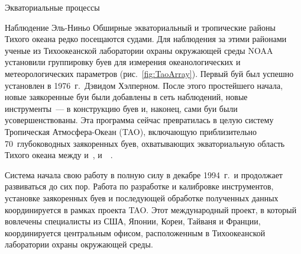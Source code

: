 \begin{chapter}{Экваториальные процессы}
\begin{section}{Наблюдение Эль-Ниньо}
%
Обширные экваториальный и тропические районы Тихого океана редко
посещаются судами. Для наблюдения за этими районами ученые из
Тихоокеанской лаборатории охраны окружающей среды NOAA 
установили группировку буев для измерения океанологических и
метеорологических параметров (рис.~\ref{fig:TaoArray}). Первый буй был успешно
установлен в 1976~г.\ Дэвидом Хэлперном. После этого простейшего
начала, новые заякоренные буи были добавлены в сеть наблюдений, новые
инструменты~--- в конструкцию буев и, наконец, сами буи
были усовершенствованы. Эта программа сейчас превратилась в целую
систему Тропическая Атмосфера-Океан (TAO), включающую приблизительно
70~глубоководных заякоренных буев, охватывающих
экваториальную область Тихого океана между  и~, 
 и~~\cite{McPhaden:1998}.
%

Система начала свою работу в полную силу в декабре 1994~г.\ и 
продолжает развиваться до сих пор. Работа по разработке и калибровке
инструментов, установке заякоренных буев и последующей обработке
полученных данных координируется в рамках проекта TAO. Этот международный
проект, в который вовлечены специалисты из США, Японии, Кореи, Тайваня 
и Франции, координируется центральным офисом, расположенным
в Тихоокеанской лаборатории охраны окружающей среды.
%


\end{section}
\end{chapter}
